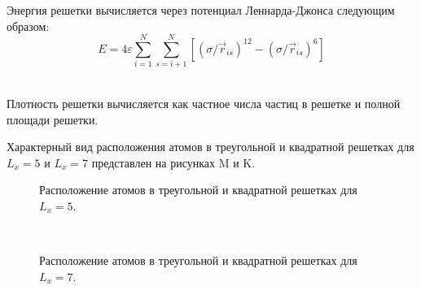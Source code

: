 \documentclass[14pt,a4paper,report]{ncc}
\begin{document}
Энергия решетки вычисляется через потенциал Леннарда-Джонса следующим образом:
\begin{equation}
E=4 \varepsilon \sum\limits_{i=1}^N \sum\limits_{s=i+1}^N{ [(\sigma/\vec{r}_{is})^{12} - (\sigma/\vec{r}_{is})^{6}  ]}
\end{equation}
\

Плотность решетки вычисляется как частное числа частиц в решетке и полной площади решетки.

Характерный вид расположения атомов в треугольной и квадратной решетках для $L_x=5$ и $L_x=7$ представлен на рисунках M и K. 
\begin{figure}[h]
\caption{Расположение атомов в треугольной и квадратной решетках для $L_x=5$.}
\label{ris:image}
\end{figure}
\
\begin{figure}[h]
\caption{Расположение атомов в треугольной и квадратной решетках для $L_x=7$.}
\label{ris:image}
\end{figure}
\
\end{document}
